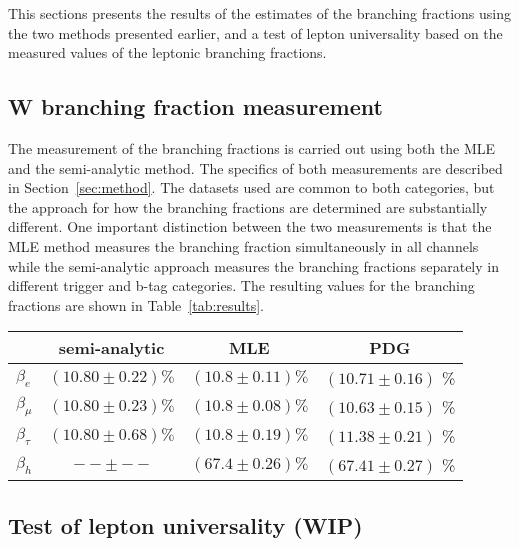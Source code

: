 
This sections presents the results of the estimates of the branching
fractions using the two methods presented earlier, and a test of lepton
universality based on the measured values of the leptonic branching
fractions.

\subsection{W branching fraction measurement}

The measurement of the branching fractions is carried out using both the
MLE and the semi-analytic method.  The specifics of both measurements
are described in Section~\ref{sec:method}.  The datasets used are common
to both categories, but the approach for how the branching fractions are
determined are substantially different.  One important distinction
between the two measurements is that the MLE method measures the
branching fraction simultaneously in all channels while the
semi-analytic approach measures the branching fractions separately in
different trigger and b-tag categories.  The resulting values for the
\PW branching fractions are shown in
Table~\ref{tab:results}.

\begin{table}[h]
    \centering
    \begin{tabular}{l|c|c|c}
                   & semi-analytic          & MLE                   & PDG                   \\
    \hline                                                                 
    $\beta_{e}$    & $ (10.80 \pm 0.22) \%$ & $(10.8 \pm 0.11) \%$ & $(10.71 \pm 0.16)$ \% \\
    $\beta_{\mu}$  & $ (10.80 \pm 0.23) \%$ & $(10.8 \pm 0.08) \%$ & $(10.63 \pm 0.15)$ \% \\
    $\beta_{\tau}$ & $ (10.80 \pm 0.68) \%$ & $(10.8 \pm 0.19) \%$ & $(11.38 \pm 0.21)$ \% \\
    $\beta_{h}$    & $-- \pm --$            & $(67.4 \pm 0.26) \%$ & $(67.41 \pm 0.27)$ \% \\
    \end{tabular}
\end{table}

\FloatBarrier
\subsection{Test of lepton universality (\textbf{WIP})}


